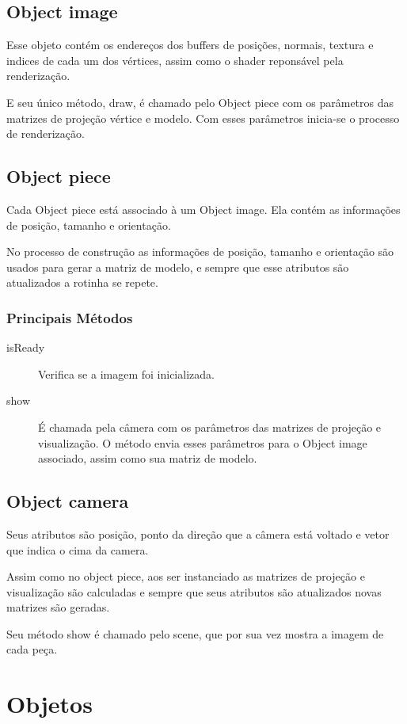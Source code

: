 \documentclass[a4paper,12pt]{article}
\begin{document}
\subsection{Object image}
Esse objeto contém os endereços dos buffers de posições, normais, textura e indices de cada um dos vértices, assim como o shader reponsável pela renderização.

E seu único método, draw, é chamado pelo Object piece com os parâmetros das matrizes de projeção vértice e modelo. Com esses parâmetros inicia-se o processo de renderização.

\subsection{Object piece}
Cada Object piece está associado à um Object image. Ela contém as informações de posição, tamanho e orientação.

No processo de construção as informações de posição, tamanho e orientação são usados para gerar a matriz de modelo, e sempre que esse atributos são atualizados a rotinha se repete.

\subsubsection{Principais Métodos}
\begin{description}
\item[isReady] Verifica se a imagem foi inicializada.
\item[show] É chamada pela câmera com os parâmetros das matrizes de projeção e visualização. O método envia esses parâmetros para o Object image associado, assim como sua matriz de modelo.
\end{description}
\subsection{Object camera}
Seus atributos são posição, ponto da direção que a câmera está voltado e vetor que indica o cima da camera.

Assim como no object piece, aos ser instanciado as matrizes de projeção e visualização são calculadas e sempre que seus atributos são atualizados novas matrizes são geradas.

Seu método show é chamado pelo scene, que por sua vez mostra a imagem de cada peça.


\section{Objetos}
\mbox{}
\end{document}
